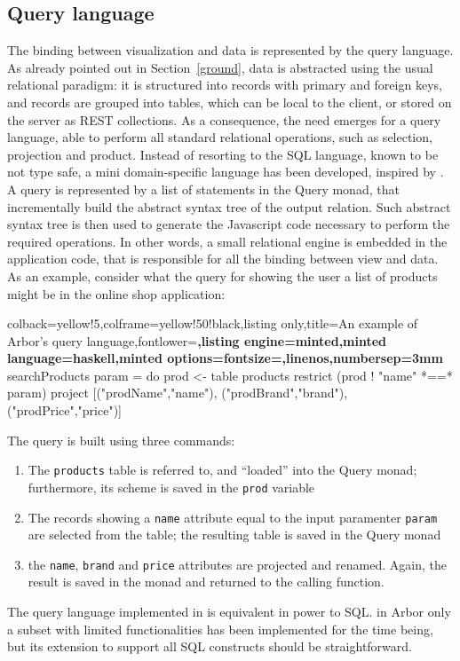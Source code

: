 \documentclass[12pt]{article} %
\newcommand{\dsl}{domain-specific language}
\newcommand{\abs}{abstract syntax tree}
\newcommand{\A}{Arbor}
\newcommand{\myverb}[1]{\texttt{\footnotesize #1}}
\newcommand{\q}[1]{``#1''}
\begin{document}
\subsection{Query language}\label{query}
The binding between visualization and data is represented by the query language. As already pointed out in Section~\ref{ground}, data is abstracted using the usual relational paradigm: it is structured into records with primary and foreign keys, and records are grouped into tables, which can be local to the client, or stored on the server as REST collections. As a consequence, the need emerges for a query language, able to perform all standard relational operations, such as selection, projection and product. Instead of resorting to the SQL language, known to be not type safe, a mini \dsl{} has been developed, inspired by \cite{leijen}. A query is represented by a list of statements in the Query monad, that incrementally build the \abs{} of the output relation. Such \abs{} is then used to generate the Javascript code necessary to perform the required operations. In other words, a small relational engine is embedded in the application code, that is responsible for all the binding between view and data.
As an example, consider what the query for showing the user a list of products might be in the online shop application:
\begin{tcblisting}{colback=yellow!5,colframe=yellow!50!black,listing only,title=An example of \A{}'s query language,fontlower=\sffamily\bfseries,listing engine=minted,minted language=haskell,minted options={fontsize=\fontsize{7}{8}\selectfont,linenos,numbersep=3mm}}
searchProducts param = do 
    prod <- table products
    restrict (prod ! "name" *==* param)
    project [("prodName","name"),
             ("prodBrand","brand"),	
             ("prodPrice","price")]
\end{tcblisting}

The query is built using three commands:
\begin{enumerate}
\item The \myverb{products} table is referred to, and \q{loaded} into the Query monad; furthermore, its scheme is saved in the \myverb{prod} variable
\item The records showing a \myverb{name} attribute equal to the input paramenter \myverb{param} are selected from the table; the resulting table is saved in the Query monad 
\item the \myverb{name}, \myverb{brand} and \myverb{price} attributes are projected and renamed. Again, the result is saved in the monad and returned to the calling function.
\end{enumerate}
The query language implemented in \cite{leijen} is equivalent in power to SQL. in \A{} only a subset with limited functionalities has been implemented for the time being, but its extension to support all SQL constructs should be straightforward.
\end{document}
